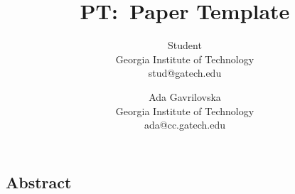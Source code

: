 \documentclass[letterpaper,twocolumn,10pt]{article}
\begin{document}
\date{}

\title{\Large \bf PT:\ Paper Template}

\author{
  {\rm Student}\\
  Georgia Institute of Technology\\
  stud@gatech.edu
  \and
  {\rm Ada Gavrilovska}\\
  Georgia Institute of Technology\\
  ada@cc.gatech.edu
}

\maketitle


\subsection*{Abstract}











%



\end{document}
